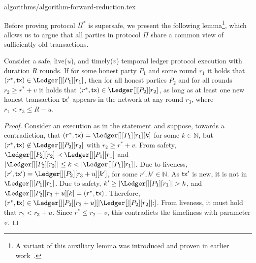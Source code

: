 {algorithms/algorithm-forward-reduction.tex}

Before proving protocol $\Pi^*$ is supersafe, we present
the following lemma\footnote{
  A variant of this auxiliary lemma was introduced and proven in earlier work~\cite{rollerblade}.
}, which allows us to argue that all
parties in protocol $\Pi$ share a common view of sufficiently old transactions.



\begin{lemma}\label{lem:past-perfect}
  Consider a safe, live($u$), and timely($v$) temporal ledger protocol
  execution with duration $R$ rounds.
  If for some honest party $P_1$ and some round $r_1$ it holds that
  $(r^*, \tx) \in \Ledger[][P_1][r_1]$, then
  for all honest parties $P_2$ and for all rounds $r_2 \geq r^* + v$
  it holds that $(r^*, \tx) \in \Ledger[][P_2][r_2]$,
  as long as at least one new honest transaction $\textsf{tx}'$ appears in the
  network at any round $r_3$, where $r_1 < r_3 \leq R - u$.
\end{lemma}
\begin{proof}
  Consider an execution as in the statement and suppose, towards a contradiction,
  that $(r^*, \tx) = \Ledger[][P_1][r_1][k]$ for some $k \in \mathbb{N}$,
  but $(r^*, \tx) \not\in \Ledger[][P_2][r_2]$
  with $r_2 \geq r^* + v$.
  From safety,
  $\Ledger[][P_2][r_2] \prec \Ledger[][P_1][r_1]$ and
  $|\Ledger[][P_2][r_2]| \leq k < |\Ledger[][P_1][r_1]|$.
  Due to liveness, $(r', \tx') = \Ledger[][P_2][r_3 + u][k']$,
  for some $r', k' \in \mathbb{N}$.
  As $\textsf{tx}'$ is new, it is not in $\Ledger[][P_1][r_1]$.
  Due to safety, $k' \geq |\Ledger[][P_1][r_1]| > k$, and
  $\Ledger[][P_2][r_3 + u][k] = (r^*, \tx)$.
  Therefore,
  $(r^*, \tx) \in \Ledger[][P_2][r_3 + u][|\Ledger[][P_2][r_2]|{:}]$.
  From liveness, it must hold that $r_2 < r_3 + u$.
  Since $r^* \leq r_2 - v$, this contradicts the timeliness with parameter $v$.\Qed
\end{proof}


